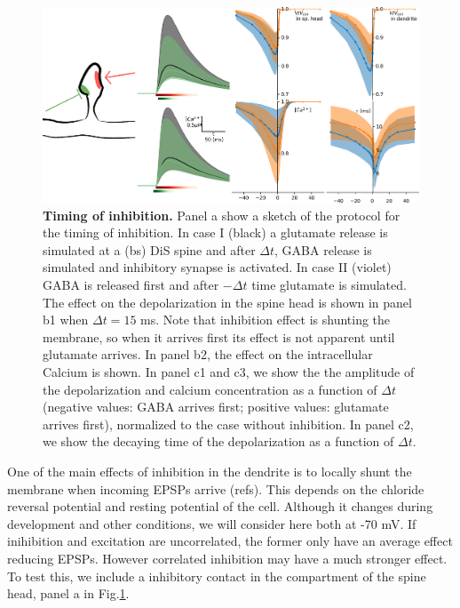 \documentclass[10pt,letterpaper]{article}
\begin{document}
\begin{figure}[tb!]
\includegraphics[width=1.0\linewidth]{f2}
\caption{{\bf Timing of inhibition.} 
Panel a show a sketch of the protocol for the timing of inhibition. In case  I (black) a glutamate release is simulated at a (bs) DiS spine and after $\Delta t$, GABA release is simulated and inhibitory synapse is activated. In case II (violet) GABA is released first and after $-\Delta t$ time  glutamate is simulated. The effect on the depolarization in the spine head is shown in panel b1 when $\Delta t= 15$ ms. Note that inhibition effect is shunting the membrane, so when it arrives first its effect is not apparent until glutamate arrives. In panel b2, the effect on the intracellular Calcium is shown.
In panel c1 and c3, we show the the amplitude of the depolarization and calcium concentration as a function of $\Delta t$ (negative values: GABA arrives first; positive values: glutamate arrives first), normalized to the case without inhibition. In panel c2, we show the decaying time of the depolarization as a function of $\Delta t$.
}\label{fig:TimingInhibition}
\end{figure}

One of the main effects of inhibition in the dendrite is to locally shunt the membrane when incoming EPSPs arrive (refs). 
This depends on the chloride reversal potential and resting potential of the cell. Although it changes during development and other conditions, we will consider here both at -70 mV. If inihibition and excitation are uncorrelated, the former only have an average effect reducing EPSPs. However correlated inhibition may have a much stronger effect. To test this, we include a inhibitory contact in the compartment of the spine head, panel a in Fig.\ref{fig:TimingInhibition}. 
\end{document}
